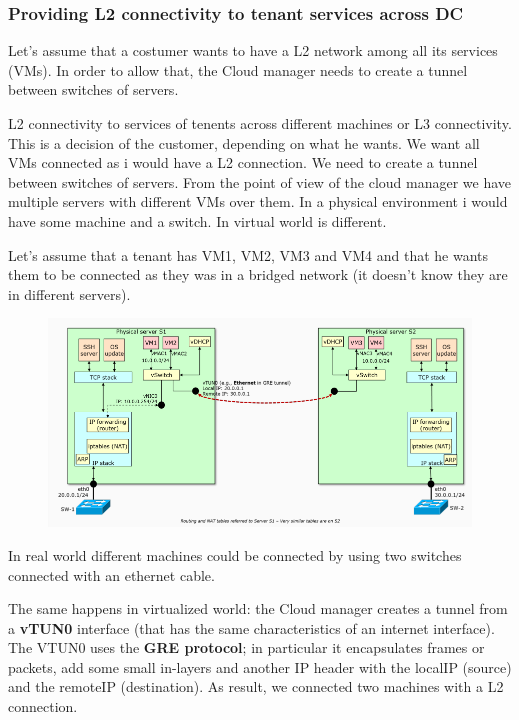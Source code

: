     \subsubsection{Providing L2 connectivity to tenant services across DC}
    
        Let's assume that a costumer wants to have a L2 network among all its services (VMs). In order to allow that, the Cloud manager needs to create a tunnel between switches of servers.
        
        
        
        L2 connectivity to services of tenents across different machines or L3 connectivity. This is a decision of the customer, depending on what he wants. We want all VMs connected as i would have a L2 connection. We need to create a tunnel between switches of servers.
        From the point of view of the cloud manager we have multiple servers with different VMs over them.
        In a physical environment i would have some machine and a switch. In virtual world is different. 
            
        \FloatBarrier
        Let's assume that a tenant has VM1, VM2, VM3 and VM4 and that he wants them to be connected as they was in a bridged network (it doesn't know they are in different servers).
        \begin{figure}[h!]
            \centering
            \includegraphics[scale=0.5]{images/example of tunneling.png}
        \end{figure}
        \FloatBarrier
        
        In real world different machines could be connected by using two switches connected with an ethernet cable.
        
        The same happens in virtualized world: the Cloud manager creates a tunnel from a \textbf{vTUN0} interface (that has the same characteristics of an internet interface). The VTUN0 uses the \textbf{GRE protocol}; in particular it encapsulates frames or packets, add some small in-layers and another IP header with the localIP (source) and the remoteIP (destination).
        As result, we connected two machines with a L2 connection.
        
